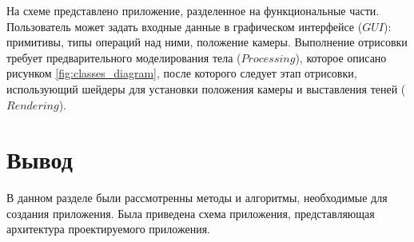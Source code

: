 На схеме представлено приложение, разделенное на функциональные части.
Пользователь может задать входные данные в графическом интерфейсе ($GUI$): примитивы, типы операций над ними,
положение камеры.
Выполнение отрисовки требует предварительного моделирования тела ($Processing$), которое описано рисунком \ref{fig:classes_diagram}, после
которого следует этап отрисовки, использующий шейдеры для установки положения камеры и выставления теней ($Rendering$).
% 




\section{Вывод}
В данном разделе были рассмотренны методы и алгоритмы, необходимые для создания 
приложения. Была приведена схема приложения, представляющая архитектура проектируемого приложения.


